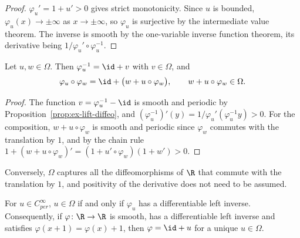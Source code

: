 \begin{proof}
  \leanok
  $\varphi_u' = 1 + u' > 0$ gives strict monotonicity. Since $u$ is bounded, $\varphi_u(x) \to
  \pm\infty$ as $x \to \pm\infty$, so $\varphi_u$ is surjective by the intermediate value
  theorem. The inverse is smooth by the one-variable inverse function theorem, its derivative
  being $1/\varphi_u' \circ \varphi_u^{-1}$.
\end{proof}

\begin{theorem}
  \label{thm:ex-omega-group}
  \leanok
  Let $u, w \in \Omega$. Then $\varphi_u^{-1} = \id + v$ with $v \in \Omega$, and
  \[
    \varphi_u \circ \varphi_w = \id + \bigl(w + u \circ \varphi_w\bigr), \qquad
    w + u \circ \varphi_w \in \Omega .
  \]
\end{theorem}

\begin{proof}
  \leanok
  The function $v = \varphi_u^{-1} - \id$ is smooth and periodic by
  Proposition~\ref{prop:ex-lift-diffeo}, and $(\varphi_u^{-1})'(y) =
  1/\varphi_u'(\varphi_u^{-1}y) > 0$. For the composition, $w + u \circ \varphi_w$ is smooth and
  periodic since $\varphi_w$ commutes with the translation by $1$, and by the chain rule
  $1 + (w + u \circ \varphi_w)' = (1 + u' \circ \varphi_w)(1 + w') > 0$.
\end{proof}

Conversely, $\Omega$ captures all the diffeomorphisms of $\R$ that commute with the
translation by $1$, and positivity of the derivative does not need to be assumed.

\begin{theorem}
  \label{thm:ex-omega-characterization}
  \leanok
  For $u \in C^\infty_{per}$, $u \in \Omega$ if and only if $\varphi_u$ has a differentiable
  left inverse. Consequently, if $\varphi \colon \R \to \R$ is smooth, has a differentiable left
  inverse and satisfies $\varphi(x + 1) = \varphi(x) + 1$, then $\varphi = \id + u$ for a unique
  $u \in \Omega$.
\end{theorem}

